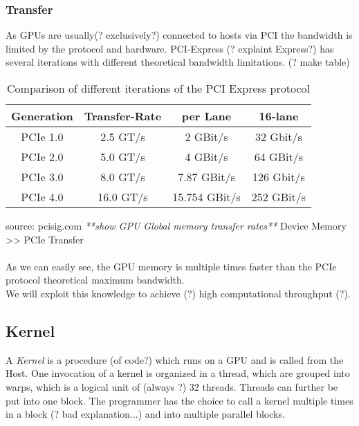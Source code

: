 \subsubsection{Transfer}
As GPUs are usually(? exclusively?) connected to hosts via PCI the bandwidth is limited by the protocol and hardware.
PCI-Express (? explaint Express?) has several iterations with different theoretical bandwidth limitations.
(? make table)
\begin{table*}
\centering
\begin{tabular}{c|c|c|c}
\textbf{Generation} &   \textbf{Transfer-Rate}      & \textbf{per Lane} & \textbf{16-lane}\\
\hline\hline
PCIe 1.0     &   2.5 GT/s               & 2 GBit/s          & 32 Gbit/s\\
PCIe 2.0     &   5.0 GT/s               & 4 GBit/s          & 64 GBit/s\\
PCIe 3.0     &   8.0 GT/s               & 7.87 GBit/s       & 126 Gbit/s\\
PCIe 4.0     &   16.0 GT/s              & 15.754 GBit/s     & 252 GBit/s\\
\hline
\end{tabular}
\caption{Comparison of different iterations of the PCI Express protocol}
\label{tab:pci_comp}
\end{table*}
source: pcisig.com
\emph{**show GPU Global memory transfer rates**}
Device Memory >> PCIe Transfer\\\\
As we can easily see, the GPU memory is multiple times faster than the PCIe protocol theoretical maximum bandwidth.\\
We will exploit this knowledge to achieve (?) high computational throughput (?).
\subsection{Kernel}
A \emph{Kernel} is a procedure (of code?) which runs on a GPU and is called from the Host.
One invocation of a kernel is organized in a thread, which are grouped into warps, which is a logical unit of (always ?) 32 threads.
Threads can further be put into one block. The programmer has the choice to call a kernel multiple times in a block (? bad explanation...) and into multiple parallel blocks.

